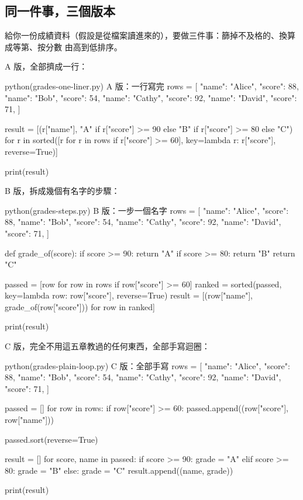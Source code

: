 \subsection*{同一件事，三個版本}

給你一份成績資料（假設是從檔案讀進來的），要做三件事：篩掉不及格的、換算成等第、按分數
由高到低排序。

A 版，全部擠成一行：

\begin{example}{python}{(grades-one-liner.py) A 版：一行寫完}
rows = [
    {"name": "Alice", "score": 88},
    {"name": "Bob", "score": 54},
    {"name": "Cathy", "score": 92},
    {"name": "David", "score": 71},
]

result = [(r["name"], "A" if r["score"] >= 90 else "B" if r["score"] >= 80 else "C") for r in sorted([r for r in rows if r["score"] >= 60], key=lambda r: r["score"], reverse=True)]

print(result)
\end{example}


B 版，拆成幾個有名字的步驟：

\begin{example}{python}{(grades-steps.py) B 版：一步一個名字}
rows = [
    {"name": "Alice", "score": 88},
    {"name": "Bob", "score": 54},
    {"name": "Cathy", "score": 92},
    {"name": "David", "score": 71},
]


def grade_of(score):
    if score >= 90:
        return "A"
    if score >= 80:
        return "B"
    return "C"


passed = [row for row in rows if row["score"] >= 60]
ranked = sorted(passed, key=lambda row: row["score"], reverse=True)
result = [(row["name"], grade_of(row["score"])) for row in ranked]

print(result)
\end{example}


C 版，完全不用這五章教過的任何東西，全部手寫迴圈：

\begin{example}{python}{(grades-plain-loop.py) C 版：全部手寫}
rows = [
    {"name": "Alice", "score": 88},
    {"name": "Bob", "score": 54},
    {"name": "Cathy", "score": 92},
    {"name": "David", "score": 71},
]

passed = []
for row in rows:
    if row["score"] >= 60:
        passed.append((row["score"], row["name"]))

passed.sort(reverse=True)

result = []
for score, name in passed:
    if score >= 90:
        grade = "A"
    elif score >= 80:
        grade = "B"
    else:
        grade = "C"
    result.append((name, grade))

print(result)
\end{example}

